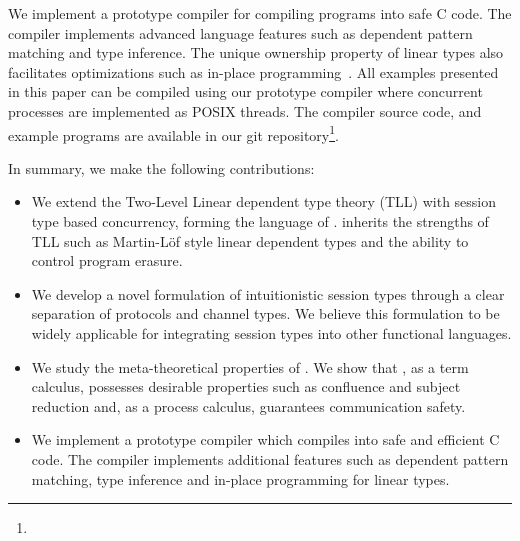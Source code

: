 We implement a prototype compiler for compiling \TLLC{} programs into safe C
code. The compiler implements advanced language features such as dependent
pattern matching and type inference. The unique ownership property of linear types
also facilitates optimizations such as in-place programming~\cite{lorenzen23}.
All examples presented in this paper can be compiled using our
prototype compiler where concurrent processes are implemented as POSIX
threads. The compiler source code, and example \TLLC{} programs are available
in our git repository\footnote{\TODO}.

In summary, we make the following contributions:
\begin{itemize}
  \item We extend the Two-Level Linear dependent type theory (TLL) with session
        type based concurrency, forming the language of \TLLC{}. \TLLC{} inherits the
        strengths of TLL such as Martin-L\"{o}f style linear dependent types and the
        ability to control program erasure.
  \item We develop a novel formulation of intuitionistic session types
        through a clear separation of protocols and channel types. We believe
        this formulation to be widely applicable for integrating session types into
        other functional languages.
  \item We study the meta-theoretical properties of \TLLC{}. We show that
        \TLLC{}, as a term calculus, possesses desirable properties such as confluence and
        subject reduction and, as a process calculus, guarantees communication safety.
  \item We implement a prototype compiler which compiles \TLLC{} into safe and
        efficient C code. The compiler implements additional features such as
        dependent pattern matching, type inference and in-place programming for linear types.
\end{itemize}


